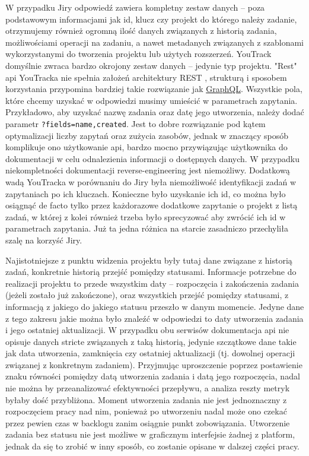 W przypadku Jiry odpowiedź zawiera kompletny zestaw danych -- poza podstawowym informacjami jak id, klucz czy projekt do którego należy zadanie, otrzymujemy również ogromną ilość
danych związanych z historią zadania, możliwościami operacji na zadaniu, a nawet metadanych związanych z szablonami wykorzystanymi do tworzenia projektu lub użytych rozszerzeń.
YouTrack domyślnie zwraca bardzo okrojony zestaw danych -- jedynie typ projektu. "Rest" api YouTracka nie spełnia założeń architektury REST \cite{RoyTFieldingRest}, strukturą i sposobem korzystania przypomina 
bardziej takie rozwiązanie jak \href{https://graphql.org/}{GraphQL}. Wszystkie pola, które chcemy uzyskać w odpowiedzi musimy umieścić w parametrach zapytania.
Przykładowo, aby uzyskać nazwę zadania oraz datę jego utworzenia, należy dodać parametr \texttt{?fields=name,created}. Jest to dobre rozwiązanie pod kątem optymalizacji liczby zapytań oraz zużycia zasobów, jednak
w znaczący sposób komplikuje ono użytkowanie api, bardzo mocno przywiązując użytkownika do dokumentacji w celu odnalezienia informacji o dostępnych danych. W przypadku niekompletności dokumentacji reverse-engineering jest niemożliwy.
Dodatkową wadą YouTracka w porównaniu do Jiry była niemożliwość identyfikacji zadań w zapytaniach po ich kluczach. Konieczne było uzyskanie ich id, co można było osiągnąć de facto tylko przez każdorazowe dodatkowe zapytanie o projekt z listą zadań, w której z kolei
również trzeba było sprecyzować aby zwrócić ich id w parametrach zapytania. Już ta jedna różnica na starcie zasadniczo przechyliła szalę na korzyść Jiry.

Najistotniejsze z punktu widzenia projektu były tutaj dane związane z historią zadań, konkretnie historią przejść pomiędzy statusami.
Informacje potrzebne do realizacji projektu to przede wszystkim daty -- rozpoczęcia i zakończenia zadania (jeżeli zostało już zakończone), oraz wszystkich przejść pomiędzy statusami, z informacją
z jakiego do jakiego statusu przeszło w danym momencie. Jedyne dane z tego zakresu jakie można było znaleźć w odpowiedzi to daty utworzenia zadania i jego ostatniej aktualizacji.
W przypadku obu serwisów dokumentacja api nie opisuje danych stricte związanych z taką historią, jedynie szczątkowe dane takie jak data utworzenia, zamknięcia czy ostatniej aktualizacji (tj. dowolnej operacji związanej z konkretnym zadaniem).
Przyjmując uproszczenie poprzez postawienie znaku równości pomiędzy datą utworzenia zadania i datą jego rozpoczęcia, nadal nie można by przeanalizować efektywności przepływu, a analiza reszty metryk byłaby dość przybliżona.
Moment utworzenia zadania nie jest jednoznaczny z rozpoczęciem pracy nad nim, ponieważ po utworzeniu nadal może ono czekać przez pewien czas w backlogu zanim osiągnie punkt zobowiązania.
Utworzenie zadania bez statusu nie jest możliwe w graficznym interfejsie żadnej z platform, jednak da się to zrobić w inny sposób, co zostanie opisane w dalszej części pracy.

